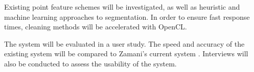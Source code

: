 \documentclass[10pt,twocolumn]{article}
\begin{document}
Existing point feature schemes will be investigated, as well as heuristic and machine learning approaches to segmentation. In order to ensure fast response times, cleaning methods will be accelerated with OpenCL.

The system will be evaluated in a user study. The speed and accuracy of the existing system will be compared to Zamani's current system \cite{Leica2012}. Interviews will also be conducted to assess the usability of the system.








%
%	
%		
%		
%	


	
\end{document}
